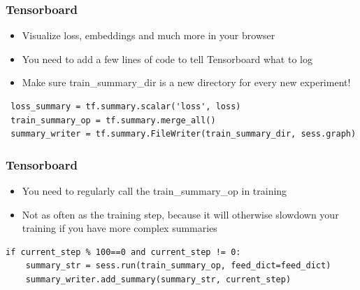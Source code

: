 \documentclass{beamer}
\begin{document}
 \begin{frame}[fragile]
 
 \frametitle{Tensorboard}
  \begin{itemize}
		\item Visualize loss, embeddings and much more in your browser
		\item You need to add a few lines of code to tell Tensorboard what to log
		\item Make sure train\_summary\_dir is a new directory for every new experiment!
	\end{itemize}
			
	\begin{tiny}
\begin{lstlisting}
 loss_summary = tf.summary.scalar('loss', loss) 
 train_summary_op = tf.summary.merge_all()
 summary_writer = tf.summary.FileWriter(train_summary_dir, sess.graph)
\end{lstlisting}   
\end{tiny}    
	
\end{frame}

\begin{frame}[fragile]
 
 \frametitle{Tensorboard}
  \begin{itemize}
		\item You need to regularly call the train\_summary\_op in training
		\item Not as often as the training step, because it will otherwise slowdown your training if you have more complex summaries
	\end{itemize}
			
\begin{tiny}
\begin{lstlisting}
if current_step % 100==0 and current_step != 0:
	summary_str = sess.run(train_summary_op, feed_dict=feed_dict)
	summary_writer.add_summary(summary_str, current_step)
\end{lstlisting}   
\end{tiny}    
	
\end{frame}
\end{document}
